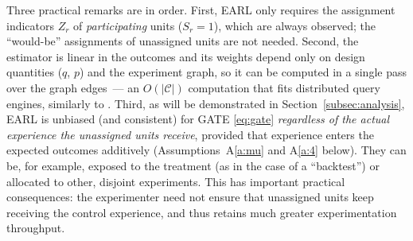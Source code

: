 \documentclass[sigconf,nonacm]{acmart}
\begin{document}
Three practical remarks are in order. First, EARL only requires the assignment indicators $Z_r$ of \emph{participating} units ($S_r=1$), which are always observed; the ``would-be'' assignments of unassigned units are not needed. Second, the estimator is linear in the outcomes and its weights depend only on design quantities ($q$, $p$) and the experiment graph, so it can be computed in a single pass over the graph edges~--- an $O(|\mathcal C|)$ computation that fits distributed query engines, similarly to \cite{shi2025scalableanalysisbipartiteexperiments}. Third, as will be demonstrated in Section~\ref{subsec:analysis}, EARL is unbiased (and consistent) for GATE \eqref{eq:gate} \emph{regardless of the actual experience the unassigned units receive}, provided that experience enters the expected outcomes additively (Assumptions~A\ref{a:mu} and A\ref{a:4} below). They can be, for example, exposed to the treatment (as in the case of a ``backtest'') or allocated to other, disjoint experiments. This has important practical consequences: the experimenter need not ensure that unassigned units keep receiving the control experience, and thus retains much greater experimentation throughput.
\end{document}
